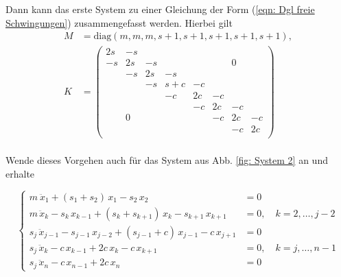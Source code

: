 \documentclass[a4paper,12pt]{report}
\newcommand{\diag}{\text{diag}}
\newcommand{\1}{\mathds{1}}
\theoremstyle{plain} %
\theoremstyle{definition} %
\theoremstyle{remark}
\begin{document}
            Dann kann das erste System zu einer Gleichung der Form (\ref{eqn: Dgl freie Schwingungen}) zusammengefasst werden.
            Hierbei gilt
            \begin{align}
                  M &= \diag(m, m, m, s+1, s+1,s+1, s+1,  s+1),\label{def: M1}\\
                  K &= \begin{pmatrix}
                        2s & -s &  &  &  &  &  &  \\
                        -s &  2s& -s &  &  &  &0  &  \\
                         & -s & 2s & -s &  &  &  &  \\
                         &  & -s & s+c & -c &  &  &  \\
                         &  &  & -c & 2c & -c &  &  \\
                         &  &  &  & -c & 2c & -c &  \\
                         & 0 &  &  &  & -c & 2c &  -c\\
                         &  &  &  &  &  & -c & 2c \\
                        \end{pmatrix}\label{def: K1}
            \end{align}\\

            Wende dieses Vorgehen auch für das System aus Abb. \ref{fig: System 2} an und erhalte
            
            $$\begin{cases}
                  m\ \ddot x_1 + (s_1+s_2)\,x_1 - s_2\,x_2 & = 0   \\
                  m\,\ddot x_k -s_k\,x_{k-1} + (s_k+s_{k+1})\,x_k -s_{k+1}\,x_{k+1} & = 0,\quad k=2,\dots,j-2\\
                  s_j\,\ddot x_{j-1} -s_{j-1}\,x_{j-2} + (s_{j-1}+c)\,x_{j-1} -c\,x_{j+1} & = 0\\
                  s_j\,\ddot x_k -c\,x_{k-1} + 2c\,x_k -c\,x_{k+1} & = 0,\quad k=j,\dots,n-1\\
                  s_j\,\ddot x_n -c\,x_{n-1}+ 2c\,x_n & = 0
            \end{cases}$$
            
\end{document}
